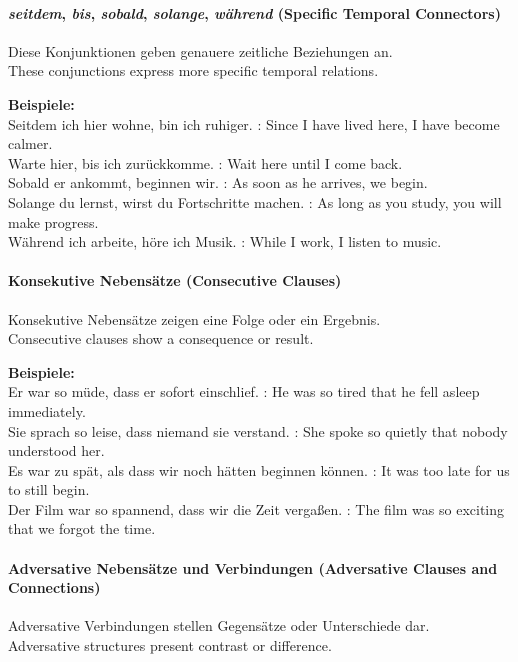 \documentclass[a4paper]{article}
\begin{document}
    \paragraph{\textit{seitdem}, \textit{bis}, \textit{sobald}, \textit{solange}, \textit{während} {\small (Specific Temporal Connectors)}}
        Diese Konjunktionen geben genauere zeitliche Beziehungen an.\\
        These conjunctions express more specific temporal relations.
        
        \textbf{Beispiele:}\\
        Seitdem ich hier wohne, bin ich ruhiger. : Since I have lived here, I have become calmer.\\
        Warte hier, bis ich zurückkomme. : Wait here until I come back.\\
        Sobald er ankommt, beginnen wir. : As soon as he arrives, we begin.\\
        Solange du lernst, wirst du Fortschritte machen. : As long as you study, you will make progress.\\
        Während ich arbeite, höre ich Musik. : While I work, I listen to music.
    
    \paragraph{Konsekutive Nebensätze {\small (Consecutive Clauses)}}
        Konsekutive Nebensätze zeigen eine Folge oder ein Ergebnis.\\
        Consecutive clauses show a consequence or result.
        
        \textbf{Beispiele:}\\
        Er war so müde, dass er sofort einschlief. : He was so tired that he fell asleep immediately.\\
        Sie sprach so leise, dass niemand sie verstand. : She spoke so quietly that nobody understood her.\\
        Es war zu spät, als dass wir noch hätten beginnen können. : It was too late for us to still begin.\\
        Der Film war so spannend, dass wir die Zeit vergaßen. : The film was so exciting that we forgot the time.
    
    \paragraph{Adversative Nebensätze und Verbindungen {\small (Adversative Clauses and Connections)}}
        Adversative Verbindungen stellen Gegensätze oder Unterschiede dar.\\
        Adversative structures present contrast or difference.
        
\end{document}
